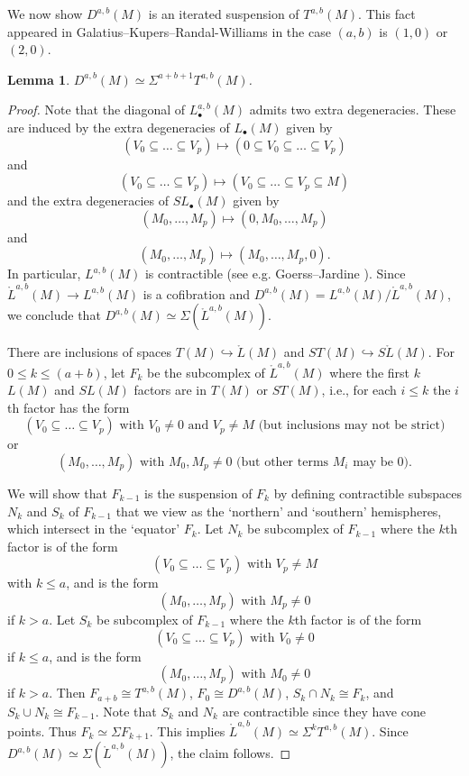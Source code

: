 \documentclass[a4paper]{amsart}
\newcommand{\m}{\to}
\numberwithin{theoremcounter}{section}
\newtheorem{lemma}[lemmaauto]{Lemma}
\theoremstyle{definition}
\theoremstyle{remark}
\begin{document}
We now show $D^{a,b}(M)$ is an iterated suspension of $T^{a,b}(M)$. This fact appeared in Galatius--Kupers--Randal-Williams \cite{e2cellsIV} in the case $(a,b)$ is $(1,0)$ or $(2,0)$.


\begin{lemma} \label{suspend}
$D^{a,b}(M) \simeq \Sigma^{a+b+1} T^{a,b}(M) $.
\end{lemma}

\begin{proof}
Note that the diagonal of $L^{a,b}_{\bullet}(M)$ admits two extra degeneracies. These are induced by the extra degeneracies of $L_\bullet(M)$ given by $$(V_0 \subseteq \dots \subseteq V_p ) \mapsto (0 \subseteq V_0 \subseteq \dots \subseteq V_p )   $$ and $$(V_0 \subseteq \dots \subseteq V_p ) \mapsto ( V_0 \subseteq \dots\subseteq V_p \subseteq M)   $$  and the extra degeneracies of $SL_\bullet(M)$ given by $$(M_0  , \dots , M_p ) \mapsto (0 , M_0 , \dots , M_p )   $$ and $$(M_0  , \dots , M_p ) \mapsto ( M_0 , \dots , M_p,0 ).   $$ In particular, $L^{a,b}(M)$ is contractible (see e.g. Goerss--Jardine \cite[Lemma 5.1]{GoerssJardine}). Since $\mathring{L}^{a,b}(M) \m L^{a,b}(M)$ is a cofibration and $D^{a,b}(M)= L^{a,b}(M)/\mathring{L}^{a,b}(M)$, we conclude that $D^{a,b}(M) \simeq \Sigma (\mathring{L}^{a,b}(M))$.
 

There are inclusions of spaces $T(M) \hookrightarrow \mathring{L}(M)$ and $ST(M) \hookrightarrow S\mathring{L}(M)$.
For $0 \leq k \leq (a+b)$, let $F_k$ be the subcomplex of $\mathring{L}^{a,b}(M)$ where the first $k$ $L(M)$ and $SL(M)$ factors are in $T(M)$ or $ST(M)$, i.e., 
for each $i\leq k$ the $i$th factor has the form 
$$(V_0 \subseteq \dots \subseteq V_p)  \text{ with }  V_0 \neq 0 \text{ and } V_p \neq M \text{ (but inclusions may not be strict)}$$
or 
$$(M_0,\dots,M_p) \text{ with }  M_0, M_p \neq 0  \text{ (but other terms $M_i$ may be 0)}.$$

 We will show that $F_{k-1}$ is the suspension of $F_k$ by defining contractible subspaces $N_k$ and $S_k$ of $F_{k-1}$ that we view as the `northern' and `southern' hemispheres, which intersect in the `equator' $F_k$. Let $N_k$ be subcomplex of $F_{k-1}$ where the $k$th factor is of the form $$(V_0 \subseteq \dots \subseteq V_p) \text{ with } V_p \neq M $$ with $k \leq a$, and is the form $$(M_0,\dots,M_p) \text{ with } M_p \neq 0$$ if $k>a$.  Let $S_k$ be subcomplex of $F_{k-1}$ where the $k$th factor is of the form $$(V_0 \subseteq \dots \subseteq V_p)  \text{ with } V_0 \neq 0 $$ if $k \leq a$, and is the form $$(M_0,\dots,M_p) \text{ with } M_0 \neq 0$$ if $k>a$. Then $F_{a+b} \cong T^{a,b}(M)$, $F_0 \cong D^{a,b}(M)$,   $S_k \cap N_k \cong F_k$, and $S_k \cup N_k \cong F_{k-1}$. Note that $S_k$ and $N_k$ are contractible since they have cone points. Thus $F_k \simeq \Sigma F_{k+1}$. This implies $\mathring{L}^{a,b}(M) \simeq \Sigma^k T^{a,b}(M)$. Since $D^{a,b}(M) \simeq \Sigma (\mathring{L}^{a,b}(M))$, the claim follows. 
\end{proof}
\end{document}
